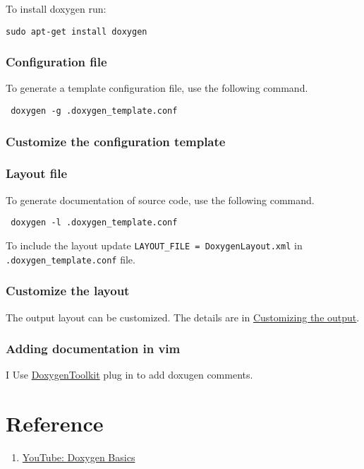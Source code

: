 To install doxygen run:

\texttt{sudo apt-get install doxygen}

\subsubsection{Configuration file}

To generate a template configuration file, use the following command.

\texttt{ doxygen -g .doxygen\_template.conf}

\subsubsection{Customize the configuration template}

\subsubsection{Layout file}

To generate documentation of source code, use the following command.

\texttt{ doxygen -l .doxygen\_template.conf}

To include the layout update \texttt{LAYOUT\_FILE            = DoxygenLayout.xml} in \texttt{.doxygen\_template.conf} file.

\subsubsection{Customize the layout}
The output layout can be customized. The details are in \href{https://doxygen.nl/manual/customize.html}{Customizing the output}.

\subsubsection{Adding documentation in vim}
I Use \href{https://github.com/vim-scripts/DoxygenToolkit.vim}{DoxygenToolkit} plug in to add doxugen comments.


\section{Reference}

\begin{enumerate}
  \item \href{https://www.youtube.com/watch?v=TtRn3HsOm1s}{YouTube: Doxygen Basics}
\end{enumerate}
